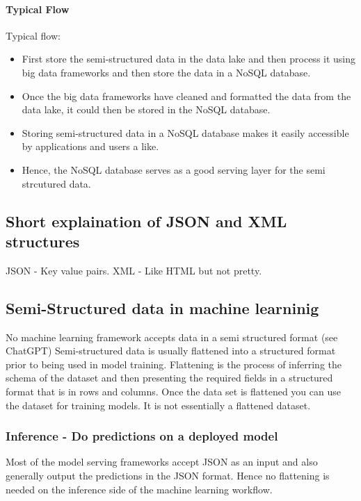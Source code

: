 \documentclass[a4paper, 11pt]{book}
\begin{document}
    \paragraph{Typical Flow}
    Typical flow:
    \begin{itemize}
        \item First store the semi-structured data in the data lake and then process it using big data frameworks and then store the data in a NoSQL database.
        \item Once the big data frameworks have cleaned and formatted the data from the data lake, it could then be stored in the NoSQL database.
        \item Storing semi-structured data in a NoSQL database makes it easily accessible by applications and users a like.
        \item Hence, the NoSQL database serves as a good serving layer for the semi strcutured data.
    \end{itemize}

    \subsection{Short explaination of JSON and XML structures}
    JSON - Key value pairs.
    XML - Like HTML but not pretty.

    \subsection{Semi-Structured data in machine learninig}
    No machine learning framework accepts data in a semi structured format (see ChatGPT)
    Semi-structured data is usually flattened into a structured format prior to being used in model training.
    Flattening is the process of inferring the schema of the dataset and then presenting the required fields in a structured format that is in rows and columns.
    Once the data set is flattened you can use the dataset for training models.
    It is not essentially a flattened dataset.

    \subsubsection{Inference - Do predictions on a deployed model}

    Most of the model serving frameworks accept JSON as an input and also generally output the predictions in the JSON format.
    Hence no flattening is needed on the inference side of the machine learning workflow.
\end{document}
